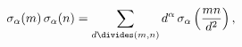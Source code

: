\[\mathop{\sigma_{\alpha}\/}\nolimits\!\left(m\right)\mathop{\sigma_{\alpha}\/}%
\nolimits\!\left(n\right)=\sum_{d\divides\left(m,n\right)}d^{\alpha}\mathop{%
\sigma_{\alpha}\/}\nolimits\left(\frac{mn}{d^{2}}\right),\]